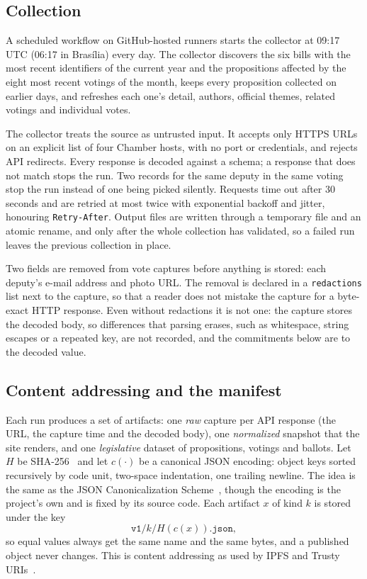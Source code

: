 \subsection{Collection}
\label{sec:collection}

A scheduled workflow on GitHub-hosted runners starts the collector at 09:17 UTC (06:17 in Bras\'ilia) every day. The collector discovers the six bills with the most recent identifiers of the current year and the propositions affected by the eight most recent votings of the month, keeps every proposition collected on earlier days, and refreshes each one's detail, authors, official themes, related votings and individual votes.

The collector treats the source as untrusted input. It accepts only HTTPS URLs on an explicit list of four Chamber hosts, with no port or credentials, and rejects API redirects. Every response is decoded against a schema; a response that does not match stops the run. Two records for the same deputy in the same voting stop the run instead of one being picked silently. Requests time out after 30 seconds and are retried at most twice with exponential backoff and jitter, honouring \texttt{Retry-After}. Output files are written through a temporary file and an atomic rename, and only after the whole collection has validated, so a failed run leaves the previous collection in place.

Two fields are removed from vote captures before anything is stored: each deputy's e-mail address and photo URL. The removal is declared in a \texttt{redactions} list next to the capture, so that a reader does not mistake the capture for a byte-exact HTTP response. Even without redactions it is not one: the capture stores the decoded body, so differences that parsing erases, such as whitespace, string escapes or a repeated key, are not recorded, and the commitments below are to the decoded value.

\subsection{Content addressing and the manifest}
\label{sec:manifest}

Each run produces a set of artifacts: one \emph{raw} capture per API response (the URL, the capture time and the decoded body), one \emph{normalized} snapshot that the site renders, and one \emph{legislative} dataset of propositions, votings and ballots. Let $H$ be SHA-256~\citep{fips180-4} and let $c(\cdot)$ be a canonical JSON encoding: object keys sorted recursively by code unit, two-space indentation, one trailing newline. The idea is the same as the JSON Canonicalization Scheme~\citep{rfc8785}, though the encoding is the project's own and is fixed by its source code. Each artifact $x$ of kind $k$ is stored under the key
\[
  \texttt{v1/}k\texttt{/}H(c(x))\texttt{.json},
\]
so equal values always get the same name and the same bytes, and a published object never changes. This is content addressing as used by IPFS and Trusty URIs~\citep{benet2014ipfs,kuhn2014trusty}.

